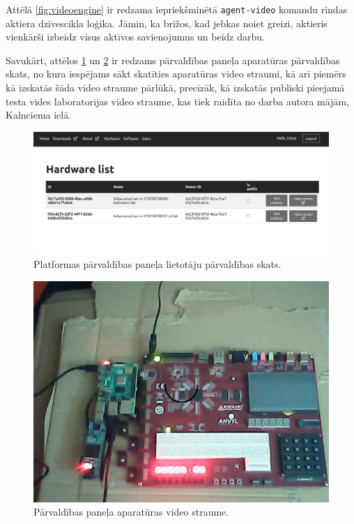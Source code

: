 Attēlā \ref{fig:videoengine} ir redzama iepriekšminētā \lstinline!agent-video!
komandu rindas aktiera dzīvescikla loģika. Jāmin, ka brīžos, kad jebkas noiet
greizi, aktieris vienkārši izbeidz visus aktīvos savienojumus un beidz darbu.

Savukārt, attēlos \ref{fig:mgmtpanelhw} un \ref{fig:hwstream} ir redzams
pārvaldības paneļa aparatūras pārvaldības skats, no kura iespējams sākt
skatīties aparatūras video straumi, kā arī piemērs kā izskatās šāda video
straume pārlūkā, precīzāk, kā izskatās publiski pieejamā
\cite{VeinbahsKrisjanisProduction} testa vides laboratorijas video straume, kas
tiek raidīta no darba autora mājām, Kalnciema ielā.

\begin{figure}[H]
    \includegraphics[width=0.9\linewidth]{assets/mgmt-panel-hw-gray.png}
    \centering
    \caption{Platformas pārvaldības paneļa lietotāju pārvaldības skats.}
    \label{fig:mgmtpanelhw}
\end{figure}

\begin{figure}[H]
    \includegraphics[width=0.9\linewidth]{assets/webcam-usage.png}
    \centering
    \caption{Pārvaldības paneļa aparatūras video straume.}
    \label{fig:hwstream}
\end{figure}

